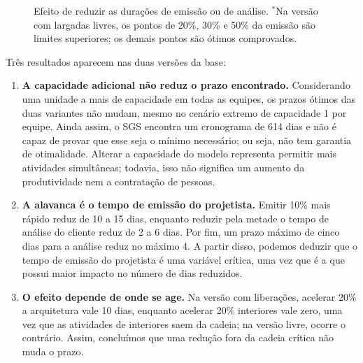 \begin{figure}[htbp]
  \centering
  \caption{Efeito de reduzir as durações de emissão ou de análise.
  $^{*}$Na versão com largadas livres, os pontos de 20\%, 30\% e 50\% da
  emissão são limites superiores; os demais pontos são ótimos
  comprovados.}
  \label{fig:curva}
\end{figure}

Três resultados aparecem nas duas versões da base:
\begin{enumerate}
  \item \textbf{A capacidade adicional não reduz o prazo encontrado.} Considerando
    uma unidade a mais de capacidade em todas as equipes, os prazos ótimos
    das duas variantes não mudam, mesmo no cenário extremo de capacidade 1 por
    equipe. Ainda assim, o SGS encontra um cronograma de 614 dias e não é capaz de provar que esse seja o mínimo necessário; ou seja, não tem garantia de otimalidade. Alterar a capacidade do
    modelo representa permitir mais atividades simultâneas; todavia, isso não significa um aumento da produtividade nem a contratação de pessoas.
  \item \textbf{A alavanca é o tempo de emissão do projetista.} Emitir
    10\% mais rápido reduz de 10 a 15 dias, enquanto reduzir pela metade o tempo de
    análise do cliente reduz de 2 a 6 dias. Por fim, um prazo máximo de cinco dias
    para a análise reduz no máximo 4. A partir disso, podemos deduzir que o tempo de emissão do projetista é uma variável crítica, uma vez que é a que possui maior impacto no número de dias reduzidos.
  \item \textbf{O efeito depende de onde se age.} Na versão com liberações,
    acelerar 20\% a arquitetura vale 10 dias, enquanto acelerar 20\% interiores
    vale zero, uma vez que as atividades de interiores saem da cadeia; na versão livre, ocorre o
    contrário. Assim, concluímos que uma redução fora da cadeia crítica não muda o prazo.
\end{enumerate}

